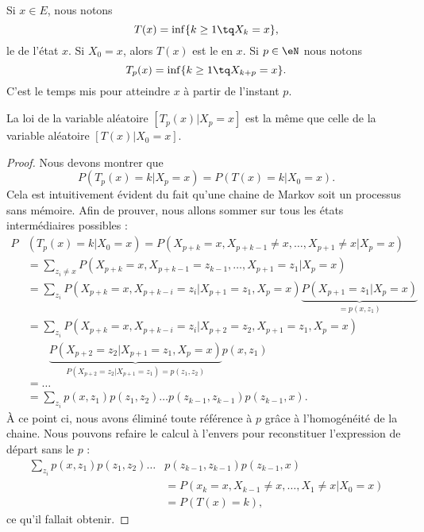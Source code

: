 Si \( x\in E\), nous notons
\begin{equation}
	T(x)=\inf\{ k\geq 1\tq X_k=x \},
\end{equation}
le  de l'état \( x\). Si \( X_0=x\), alors \( T(x)\) est le  en \( x\). Si \( p\in \eN\) nous notons
\begin{equation}
	T_p(x)=\inf\{ k\geq 1\tq X_{k+p}=x \}.
\end{equation}
C'est le temps mis pour atteindre \( x\) à partir de l'instant \( p\).

\begin{proposition}
	La loi de la variable aléatoire \( [T_p(x)|X_p=x]\) est la même que celle de la variable aléatoire \( [T(x)|X_0=x]\).
\end{proposition}

\begin{proof}
	Nous devons montrer que
	\begin{equation}
		P(T_p(x)=k|X_p=x)=P(T(x)=k|X_0=x).
	\end{equation}
	Cela est intuitivement évident du fait qu'une chaine de Markov soit un processus sans mémoire. Afin de prouver, nous allons sommer sur tous les états intermédiaires possibles :
	\begin{subequations}
		\begin{align}
			P & (T_p(x)=k|X_0=x)=P(X_{p+k}=x,X_{p+k-1}\neq x,\ldots,X_{p+1}\neq x|X_p=x)                             \\
			  & =\sum_{z_i\neq x}P(X_{p+k}=x,X_{p+k-1}=z_{k-1},\ldots,X_{p+1}=z_1|X_p=x)                             \\
			  & =\sum_{z_i}P(X_{p+k}=x,X_{p+k-i}=z_i|X_{p+1}=z_1,X_p=x)\underbrace{P(X_{p+1}=z_1|X_p=x)}_{=p(x,z_1)} \\
			  & =\sum_{z_i}P(X_{p+k}=x,X_{p+k-i}=z_i|X_{p+2}=z_2,X_{p+1}=z_1,X_p=x)                                  \\
			  & \qquad\underbrace{P(X_{p+2}=z_2|X_{p+1}=z_1,X_p=x)}_{P(X_{p+2}=z_2|X_{p+1}=z_1)=p(z_1,z_2)}p(x,z_1)  \\
			  & =\ldots                                                                                              \\
			  & =\sum_{z_i}p(x,z_1)p(z_1,z_2)\ldots p(z_{k-1},z_{k-1})p(z_{k-1},x).
		\end{align}
	\end{subequations}
	À ce point ci, nous avons éliminé toute référence à \( p\) grâce à l'homogénéité de la chaine. Nous pouvons refaire le calcul à l'envers pour reconstituer l'expression de départ sans le \( p\) :
	\begin{subequations}
		\begin{align}
			\sum_{z_i}p(x,z_1)p(z_1,z_2)\ldots & p(z_{k-1},z_{k-1})p(z_{k-1},x)                 \\
			                                   & =P(x_k=x,X_{k-1}\neq x,\ldots,X_1\neq x|X_0=x) \\
			                                   & =P(T(x)=k),
		\end{align}
	\end{subequations}
	ce qu'il fallait obtenir.
\end{proof}

